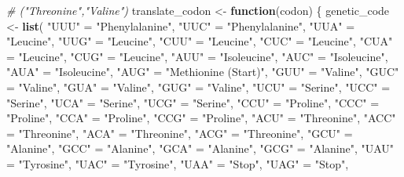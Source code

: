 \documentclass[
]{article}
\newenvironment{Shaded}{\begin{snugshade}}{\end{snugshade}}
\newcommand{\CommentTok}[1]{\textcolor[rgb]{0.56,0.35,0.01}{\textit{#1}}}
\newcommand{\ControlFlowTok}[1]{\textcolor[rgb]{0.13,0.29,0.53}{\textbf{#1}}}
\newcommand{\FunctionTok}[1]{\textcolor[rgb]{0.13,0.29,0.53}{\textbf{#1}}}
\newcommand{\NormalTok}[1]{#1}
\newcommand{\OtherTok}[1]{\textcolor[rgb]{0.56,0.35,0.01}{#1}}
\newcommand{\StringTok}[1]{\textcolor[rgb]{0.31,0.60,0.02}{#1}}
\begin{document}
\begin{Shaded}
\begin{Highlighting}[]
\CommentTok{\# ("Threonine","Valine")}
\NormalTok{translate\_codon }\OtherTok{\textless{}{-}} \ControlFlowTok{function}\NormalTok{(codon) \{}
\NormalTok{  genetic\_code }\OtherTok{\textless{}{-}} \FunctionTok{list}\NormalTok{(}
    \StringTok{"UUU"} \OtherTok{=} \StringTok{"Phenylalanine"}\NormalTok{, }\StringTok{"UUC"} \OtherTok{=} \StringTok{"Phenylalanine"}\NormalTok{, }\StringTok{"UUA"} \OtherTok{=} \StringTok{"Leucine"}\NormalTok{, }
    \StringTok{"UUG"} \OtherTok{=} \StringTok{"Leucine"}\NormalTok{, }\StringTok{"CUU"} \OtherTok{=} \StringTok{"Leucine"}\NormalTok{, }\StringTok{"CUC"} \OtherTok{=} \StringTok{"Leucine"}\NormalTok{, }\StringTok{"CUA"} \OtherTok{=} \StringTok{"Leucine"}\NormalTok{, }
    \StringTok{"CUG"} \OtherTok{=} \StringTok{"Leucine"}\NormalTok{, }\StringTok{"AUU"} \OtherTok{=} \StringTok{"Isoleucine"}\NormalTok{, }\StringTok{"AUC"} \OtherTok{=} \StringTok{"Isoleucine"}\NormalTok{, }
    \StringTok{"AUA"} \OtherTok{=} \StringTok{"Isoleucine"}\NormalTok{, }\StringTok{"AUG"} \OtherTok{=} \StringTok{"Methionine (Start)"}\NormalTok{, }\StringTok{"GUU"} \OtherTok{=} \StringTok{"Valine"}\NormalTok{, }
    \StringTok{"GUC"} \OtherTok{=} \StringTok{"Valine"}\NormalTok{, }\StringTok{"GUA"} \OtherTok{=} \StringTok{"Valine"}\NormalTok{, }\StringTok{"GUG"} \OtherTok{=} \StringTok{"Valine"}\NormalTok{, }\StringTok{"UCU"} \OtherTok{=} \StringTok{"Serine"}\NormalTok{, }
    \StringTok{"UCC"} \OtherTok{=} \StringTok{"Serine"}\NormalTok{, }\StringTok{"UCA"} \OtherTok{=} \StringTok{"Serine"}\NormalTok{, }\StringTok{"UCG"} \OtherTok{=} \StringTok{"Serine"}\NormalTok{, }\StringTok{"CCU"} \OtherTok{=} \StringTok{"Proline"}\NormalTok{, }
    \StringTok{"CCC"} \OtherTok{=} \StringTok{"Proline"}\NormalTok{, }\StringTok{"CCA"} \OtherTok{=} \StringTok{"Proline"}\NormalTok{, }\StringTok{"CCG"} \OtherTok{=} \StringTok{"Proline"}\NormalTok{, }\StringTok{"ACU"} \OtherTok{=} \StringTok{"Threonine"}\NormalTok{,}
    \StringTok{"ACC"} \OtherTok{=} \StringTok{"Threonine"}\NormalTok{, }\StringTok{"ACA"} \OtherTok{=} \StringTok{"Threonine"}\NormalTok{, }\StringTok{"ACG"} \OtherTok{=} \StringTok{"Threonine"}\NormalTok{, }
    \StringTok{"GCU"} \OtherTok{=} \StringTok{"Alanine"}\NormalTok{, }\StringTok{"GCC"} \OtherTok{=} \StringTok{"Alanine"}\NormalTok{, }\StringTok{"GCA"} \OtherTok{=} \StringTok{"Alanine"}\NormalTok{, }\StringTok{"GCG"} \OtherTok{=} \StringTok{"Alanine"}\NormalTok{,}
    \StringTok{"UAU"} \OtherTok{=} \StringTok{"Tyrosine"}\NormalTok{, }\StringTok{"UAC"} \OtherTok{=} \StringTok{"Tyrosine"}\NormalTok{, }\StringTok{"UAA"} \OtherTok{=} \StringTok{"Stop"}\NormalTok{, }\StringTok{"UAG"} \OtherTok{=} \StringTok{"Stop"}\NormalTok{, }

\end{Highlighting}
\end{Shaded}
\end{document}

